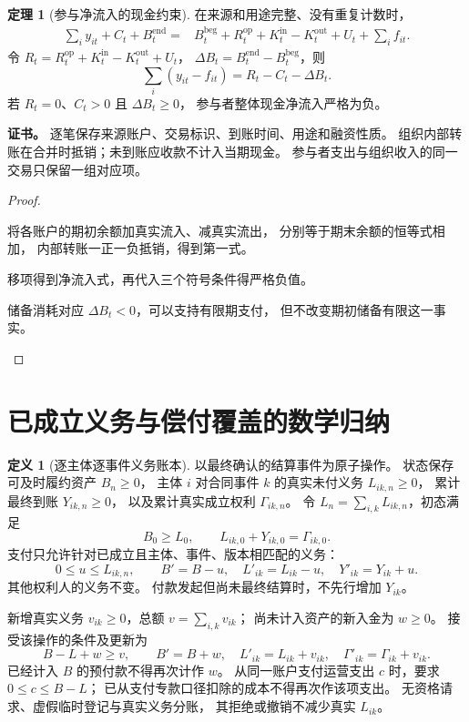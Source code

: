\documentclass[UTF8,12pt,a4paper,openany,fontset=none,zihao=false]{ctexrep}
\theoremstyle{definition}
\newtheorem{definition}{定义}[chapter]
\newtheorem{theorem}{定理}[chapter]
\newenvironment{certificate}{\par\noindent\textbf{证书。}\ignorespaces}{\par}
\newcommand{\1}{\mathbf 1}
\begin{document}
\begin{theorem}[参与净流入的现金约束]
\label{part:thm-source-balance}
在来源和用途完整、没有重复计数时，
\[
\begin{aligned}
 \sum_i y_{it}+C_t+B_t^{\mathrm{end}}
 ={}&B_t^{\mathrm{beg}}+R_t^{\mathrm{op}}
 +K_t^{\mathrm{in}}-K_t^{\mathrm{out}}+U_t+\sum_i f_{it}.
\end{aligned}
\]
令 \(R_t=R_t^{\mathrm{op}}+K_t^{\mathrm{in}}-K_t^{\mathrm{out}}+U_t\)，
\(\Delta B_t=B_t^{\mathrm{end}}-B_t^{\mathrm{beg}}\)，则
\[
 \sum_i(y_{it}-f_{it})=R_t-C_t-\Delta B_t.
\]
若 \(R_t=0\)、\(C_t>0\) 且 \(\Delta B_t\ge0\)，
参与者整体现金净流入严格为负。
\end{theorem}
\begin{certificate}
逐笔保存来源账户、交易标识、到账时间、用途和融资性质。
组织内部转账在合并时抵销；未到账应收款不计入当期现金。
参与者支出与组织收入的同一交易只保留一组对应项。
\end{certificate}
\begin{proof}
\begin{semanticsteps}
\item 将各账户的期初余额加真实流入、减真实流出，
分别等于期末余额的恒等式相加，
内部转账一正一负抵销，得到第一式。
\item 移项得到净流入式，再代入三个符号条件得严格负值。
\item 储备消耗对应 \(\Delta B_t<0\)，可以支持有限期支付，
但不改变期初储备有限这一事实。
\end{semanticsteps}
\end{proof}

\section{已成立义务与偿付覆盖的数学归纳}

\begin{definition}[逐主体逐事件义务账本]
\label{part:def-ledger}
以最终确认的结算事件为原子操作。
状态保存可及时履约资产 \(B_n\ge0\)，
主体 \(i\) 对合同事件 \(k\) 的真实未付义务 \(L_{ik,n}\ge0\)，
累计最终到账 \(Y_{ik,n}\ge0\)，
以及累计真实成立权利 \(\Gamma_{ik,n}\)。
令 \(L_n=\sum_{i,k}L_{ik,n}\)，初态满足
\[
 B_0\ge L_0,\qquad
 L_{ik,0}+Y_{ik,0}=\Gamma_{ik,0}.
\]
支付只允许针对已成立且主体、事件、版本相匹配的义务：
\[
 0\le u\le L_{ik,n},\qquad
 B'=B-u,\quad L'_{ik}=L_{ik}-u,\quad Y'_{ik}=Y_{ik}+u.
\]
其他权利人的义务不变。
付款发起但尚未最终结算时，不先行增加 \(Y_{ik}\)。

新增真实义务 \(v_{ik}\ge0\)，总额 \(v=\sum_{i,k}v_{ik}\)；
尚未计入资产的新入金为 \(w\ge0\)。
接受该操作的条件及更新为
\[
 B-L+w\ge v,\qquad
 B'=B+w,\quad L'_{ik}=L_{ik}+v_{ik},\quad
 \Gamma'_{ik}=\Gamma_{ik}+v_{ik}.
\]
已经计入 \(B\) 的预付款不得再次计作 \(w\)。
从同一账户支付运营支出 \(c\) 时，要求 \(0\le c\le B-L\)；
已从支付专款口径扣除的成本不得再次作该项支出。
无资格请求、虚假临时登记与真实义务分账，
其拒绝或撤销不减少真实 \(L_{ik}\)。
\end{definition}
\end{document}
